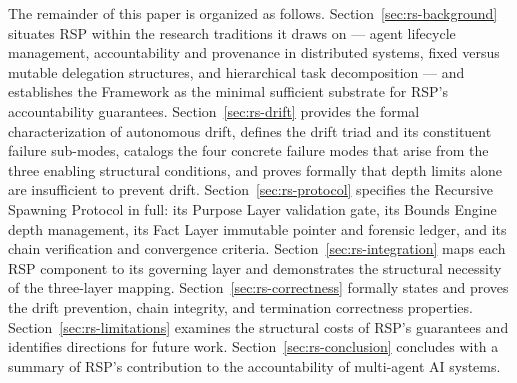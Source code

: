 The remainder of this paper is organized as follows. Section~\ref{sec:rs-background} situates RSP within the research traditions it draws on — agent lifecycle management, accountability and provenance in distributed systems, fixed versus mutable delegation structures, and hierarchical task decomposition — and establishes the \bxthree Framework as the minimal sufficient substrate for RSP's accountability guarantees. Section~\ref{sec:rs-drift} provides the formal characterization of autonomous drift, defines the drift triad and its constituent failure sub-modes, catalogs the four concrete failure modes that arise from the three enabling structural conditions, and proves formally that depth limits alone are insufficient to prevent drift. Section~\ref{sec:rs-protocol} specifies the Recursive Spawning Protocol in full: its Purpose Layer validation gate, its Bounds Engine depth management, its Fact Layer immutable pointer and forensic ledger, and its chain verification and convergence criteria. Section~\ref{sec:rs-integration} maps each RSP component to its governing \bxthree layer and demonstrates the structural necessity of the three-layer mapping. Section~\ref{sec:rs-correctness} formally states and proves the drift prevention, chain integrity, and termination correctness properties. Section~\ref{sec:rs-limitations} examines the structural costs of RSP's guarantees and identifies directions for future work. Section~\ref{sec:rs-conclusion} concludes with a summary of RSP's contribution to the accountability of multi-agent AI systems.